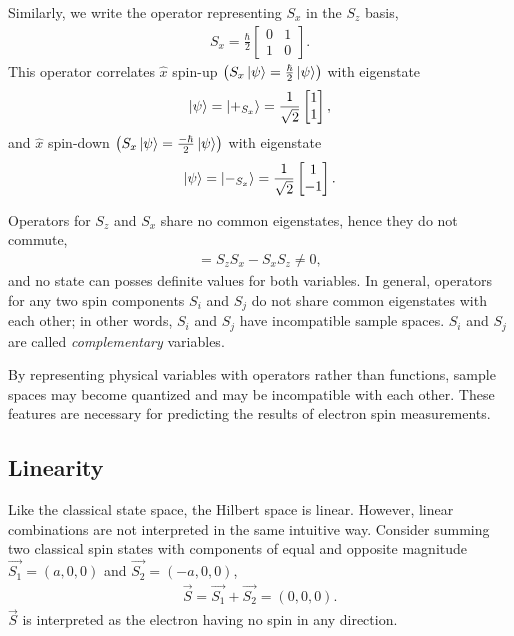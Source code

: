 Similarly, we write the operator representing $S_x$ in the $S_z$ basis,
\begin{align}
    S_x = \frac{\hbar}{2}\begin{bmatrix} 0 & 1 \\ 1 & 0 \end{bmatrix}.
\end{align}
This operator correlates $\hat{x}$ spin-up $\left(S_x \ket{\psi} = \frac{\hbar}{2} \ket{\psi}\right)$ with eigenstate
\begin{align} \label{eq:x up state}
    \ket{\psi} = \ket{+_{S_x}} = \frac{1}{\sqrt{2}}\begin{bmatrix} 1 \\ 1 \end{bmatrix},
\end{align}
and $\hat{x}$ spin-down $\left(S_x \ket{\psi} = \frac{-\hbar}{2} \ket{\psi}\right)$ with eigenstate
\begin{align} \label{eq:x down state}
    \ket{\psi} = \ket{-_{S_x}} = \frac{1}{\sqrt{2}}\begin{bmatrix} 1 \\ -1 \end{bmatrix}.
\end{align}

Operators for $S_z$ and $S_x$ share no common eigenstates, hence they do not commute,
\begin{align}
  [S_z, S_x] = S_zS_x - S_xS_z \neq 0,
\end{align}
and no state can posses definite values for both variables. In general, operators for any two spin components $S_i$ and $S_j$ do not share common eigenstates with each other; in other words, $S_i$ and $S_j$ have incompatible sample spaces. $S_i$ and $S_j$ are called \textit{complementary} variables.



By representing physical variables with operators rather than functions, sample spaces may become quantized and may be incompatible with each other. These features are necessary for predicting the results of electron spin measurements.

\subsection{Linearity}
Like the classical state space, the Hilbert space is linear. However, linear combinations are not interpreted in the same intuitive way. Consider summing two classical spin states with components of equal and opposite magnitude $\vec{S_1} = (a, 0, 0)$ and $\vec{S_2} = (-a, 0, 0)$,
\begin{align}
  \vec{S} = \vec{S_1} + \vec{S_2} = (0, 0, 0).
\end{align}
$\vec{S}$ is interpreted as the electron having no spin in any direction.

